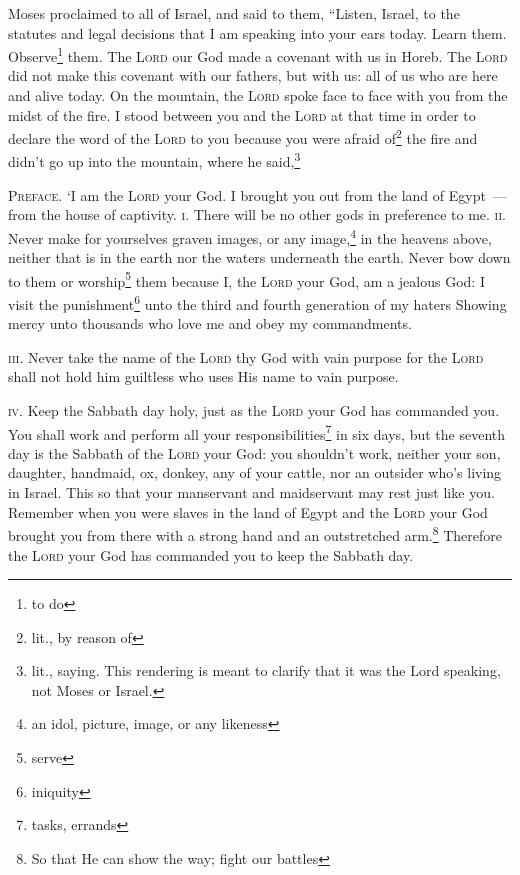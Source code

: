 
\begin{inparaenum}
     Moses proclaimed to all of Israel, and said to them, ``Listen, Israel, to the statutes and legal decisions that I am speaking into your ears today. Learn them. Observe\footnote{to do} them.%
     The \textsc{Lord} our God made a covenant with us in Horeb.%
     The \textsc{Lord} did not make this covenant with our fathers, but with us: all of us who are here and alive today.%
     On the mountain, the \textsc{Lord} spoke face to face with you from the midst of the fire.%
     I stood between you and the \textsc{Lord} at that time in order to declare the word of the \textsc{Lord} to you because you were afraid of\footnote{lit., by reason of} the fire and didn't go up into the mountain, where he said,\footnote{lit., saying. This rendering is meant to clarify that it was the Lord speaking, not Moses or Israel.}%
    
     \textsc{Preface.} `I am the \textsc{Lord} your God. I brought you out from the land of Egypt~--- from the house of captivity.%
     \textsc{i.} There will be no other gods in preference to me.%
     \textsc{ii.} Never make for yourselves graven images, or any image,\footnote{an idol, picture, image, or any likeness} in the heavens above, neither that is in the earth nor the waters underneath the earth.%
     Never bow down to them or worship\footnote{serve} them because I, the \textsc{Lord} your God, am a jealous God: I visit the punishment\footnote{iniquity} unto the third and fourth generation of my haters%
     Showing mercy unto thousands who love me and obey my commandments.%
    
     \textsc{iii.} Never take the name of the \textsc{Lord} thy God with vain purpose for the \textsc{Lord} shall not hold him guiltless who uses His name to vain purpose.%
    
     \textsc{iv.} Keep the Sabbath day holy, just as the \textsc{Lord} your God has commanded you.%
     You shall work and perform all your responsibilities\footnote{tasks, errands} in six days,%
     but the seventh day is the Sabbath of the \textsc{Lord} your God: you shouldn't work, neither your son, daughter, handmaid, ox, donkey, any of your cattle, nor an outsider who's living in Israel. This so that your manservant and maidservant may rest just like you.%
     Remember when you were slaves in the land of Egypt and the \textsc{Lord} your God brought you from there with a strong hand and an outstretched arm.\footnote{So that He can show the way; fight our battles} Therefore the \textsc{Lord} your God has commanded you to keep the Sabbath day.%
    

\end{inparaenum}

